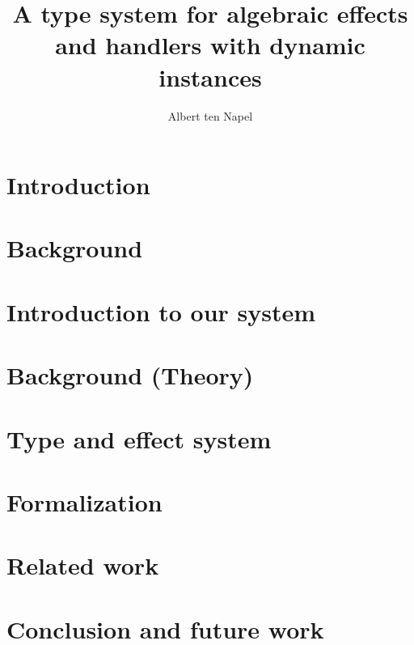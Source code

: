\documentclass[12pt]{book}
\title{A type system for algebraic effects and handlers with dynamic instances}
\author{Albert ten Napel}
\date{}
\begin{document}
\maketitle

\tableofcontents
\newpage

\chapter{Introduction}


\chapter{Background}


\chapter{Introduction to our system}


\chapter{Background (Theory)}



\chapter{Type and effect system}



\chapter{Formalization}


\chapter{Related work}


\chapter{Conclusion and future work}

\end{document}
